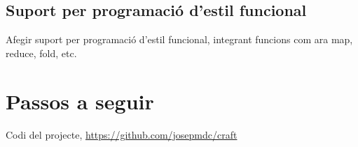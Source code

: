 ﻿\documentclass{article}
\begin{document}
\subsection{Suport per programació d'estil funcional}
Afegir suport per programació d'estil funcional, integrant funcions com ara map,
reduce, fold, etc.

\section{Passos a seguir}

\begin{thebibliography}{9}

 Codi del projecte, \url{https://github.com/josepmdc/craft}

\end{thebibliography}
\end{document}
